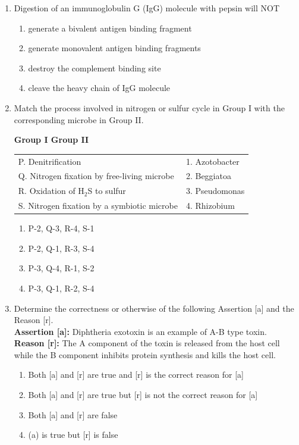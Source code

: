 \documentclass[journal,12pt,onecolumn]{IEEEtran}
\begin{document}
\begin{enumerate}[label=\arabic*.,resume]

\item Digestion of an immunoglobulin G (IgG) molecule with pepsin will NOT
\begin{enumerate}[label=(\Alph*)]
\item generate a bivalent antigen binding fragment
\item generate monovalent antigen binding fragments
\item destroy the complement binding site
\item cleave the heavy chain of IgG molecule
\end{enumerate}

\item Match the process involved in nitrogen or sulfur cycle in Group I with the corresponding microbe in Group II.

\textbf{Group I \hspace{3cm} Group II}

\begin{tabular}{ll}
P. Denitrification & 1. Azotobacter \\
Q. Nitrogen fixation by free-living microbe & 2. Beggiatoa \\
R. Oxidation of H$_2$S to sulfur & 3. Pseudomonas \\
S. Nitrogen fixation by a symbiotic microbe & 4. Rhizobium \\
\end{tabular}

\begin{multicols}{2}
\begin{enumerate}[label=(\Alph*)]
\item P-2, Q-3, R-4, S-1
\item P-2, Q-1, R-3, S-4
\item P-3, Q-4, R-1, S-2
\item P-3, Q-1, R-2, S-4
\end{enumerate}
\end{multicols}

\item Determine the correctness or otherwise of the following Assertion [a] and the Reason [r].\\
\textbf{Assertion [a]:} Diphtheria exotoxin is an example of A-B type toxin.\\
\textbf{Reason [r]:} The A component of the toxin is released from the host cell while the B component inhibits protein synthesis and kills the host cell.
\begin{enumerate}[label=(\Alph*)]
\item Both [a] and [r] are true and [r] is the correct reason for [a]
\item Both [a] and [r] are true but [r] is not the correct reason for [a]
\item Both [a] and [r] are false
\item   (a) is true but [r] is false
\end{enumerate}


\end{enumerate}
\end{document}
